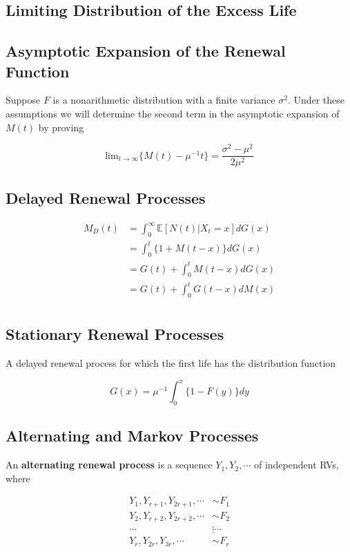 \documentclass[12pt]{article}
\theoremstyle{nonumberbreak}
\begin{document}
\subsection{Limiting Distribution of the Excess Life}



\subsection{Asymptotic Expansion of the Renewal Function}

Suppose $F$ is a nonarithmetic distribution with a finite variance $\sigma^2$. Under these assumptions we will determine the second term in the asymptotic expansion of $M(t)$ by proving

$$
\mathrm{lim}_{t\to\infty} \{ M(t) - \mu^{-1}t \} = \frac{\sigma^2 - \mu^2}{2\mu^2}
$$


\subsection{Delayed Renewal Processes}

$$
\begin{aligned}
M_D(t) &= \int_0^\infty \mathbb{E}[N(t) | X_t = x ] dG(x) \\[8pt]
&= \int_0^t \{ 1 + M(t-x) \} dG(x) \\[8pt]
&= G(t) + \int_0^t M(t-x) dG(x) \\[8pt]
&= G(t) + \int_0^t G(t-x) dM(x) \\[8pt]
\end{aligned}
$$



\subsection{Stationary Renewal Processes}

A delayed renewal process for which the first life has the distribution
function

$$
G(x) = \mu^{-1} \int_0^x \{ 1 - F(y) \} dy
$$




\subsection{Alternating and Markov Processes}

An \textbf{alternating renewal process} is a sequence $Y_1, Y_2, \cdots$ of independent RVs, where

$$
\begin{aligned}
Y_1, Y_{r+1}, Y_{2r+1}, \cdots &\sim F_1 \\[8pt]
Y_2, Y_{r+2}, Y_{2r+2}, \cdots &\sim F_2 \\[8pt]
\cdots &\vdots \cdots \\[8pt]
Y_r, Y_{2r},  Y_{3r},   \cdots &\sim F_r \\[8pt]
\end{aligned}
$$
\end{document}
